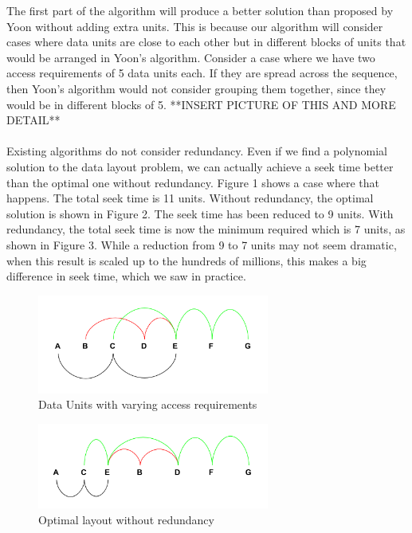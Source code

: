 \documentclass[conference]{acmsiggraph}
\begin{document}
The first part of the algorithm will produce a better solution than proposed by Yoon without adding extra units. This is because our algorithm will consider cases where data units are close to each other but in different blocks of units that would be arranged in Yoon's algorithm. Consider a case where we have two access requirements of 5 data units each. If they are spread across the sequence, then Yoon's algorithm would not consider grouping them together, since they would be in different blocks of 5. **INSERT PICTURE OF THIS AND MORE DETAIL** \\
\\
Existing algorithms do not consider redundancy. Even if we find a polynomial solution to the data layout problem, we can actually achieve a seek time better than the optimal one without redundancy. Figure 1 shows a case where that happens. The total seek time is 11 units. Without redundancy, the optimal solution is shown in Figure 2. The seek time has been reduced to 9 units. With redundancy, the total seek time is now the minimum required which is 7 units, as shown in Figure 3. While a reduction from 9 to 7 units may not seem dramatic, when this result is scaled up to the hundreds of millions, this makes a big difference in seek time, which we saw in practice.\\

\begin{figure}[ht]
\centering
\includegraphics[width=3in]{examplePic_startingProblem.png}
\caption{Data Units with varying access requirements}
\end{figure}

\begin{figure}[ht]
\centering
\includegraphics[width=3in]{examplePic_woRedundancy.png}
\caption{Optimal layout without redundancy}
\end{figure}
\end{document}
